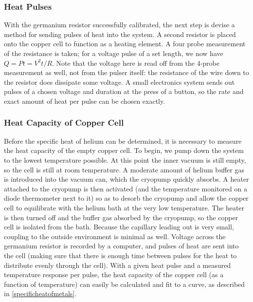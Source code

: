 \subsubsection{Heat Pulses}

With the germanium resistor successfully calibrated, the next step is devise a method for sending pulses of heat into the system. A second resistor is placed onto the copper cell to function as a heating element. A four probe measurement of the resistance is taken; for a voltage pulse of a set length, we now have $Q = P t = V^{2} t / R$. Note that the voltage here is read off from the 4-probe measurement as well, not from the pulser itself: the resistance of the wire down to the resistor does dissipate some voltage. A small electronics system sends out pulses of a chosen voltage and duration at the press of a button, so the rate and exact amount of heat per pulse can be chosen exactly.


\subsubsection{Heat Capacity of Copper Cell}

Before the specific heat of helium can be determined, it is necessary to measure the heat capacity of the empty copper cell. To begin, we pump down the system to the lowest temperature possible. At this point the inner vacuum is still empty, so the cell is still at room temperature. A moderate amount of helium buffer gas is introduced into the vacuum can, which the cryopump quickly absorbs. A heater attached to the cryopump is then activated (and the temperature monitored on a diode thermometer next to it) so as to desorb the cryopump and allow the copper cell to equilibrate with the helium bath at the very low temperature. The heater is then turned off and the buffer gas absorbed by the cryopump, so the copper cell is isolated from the bath. Because the capillary leading out is very small, coupling to the outside environment is minimal as well. Voltage across the germanium resistor is recorded by a computer, and pulses of heat are sent into the cell (making sure that there is enough time between pulses for the heat to distribute evenly through the cell). With a given heat pulse and a measured temperature response per pulse, the heat capacity of the copper cell (as a function of temperature) can easily be calculated and fit to a curve, as described in \ref{specificheatofmetals}.

